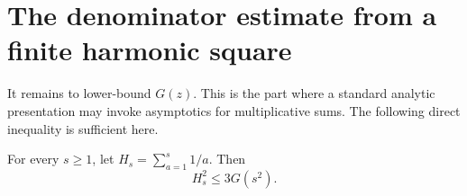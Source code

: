 \section{The denominator estimate from a finite harmonic square}
\label{sec:denominator}

It remains to lower-bound \(G(z)\). This is the part where a standard
analytic presentation may invoke asymptotics for multiplicative sums.
The following direct inequality is sufficient here.

\begin{theorem}
\label{thm:harmonic}
For every \(s\ge1\), let \(H_s=\sum_{a=1}^s1/a\). Then
\begin{equation}
 \boxed{\qquad H_s^2\le3G(s^2).\qquad}
 \label{eq:harmonic-G}
\end{equation}
\end{theorem}

